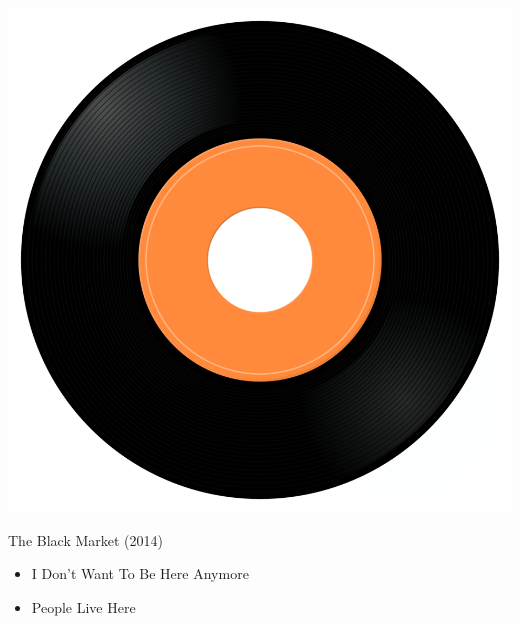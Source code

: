 \begin{minipage}[t]{0.25\textwidth}\vspace{0pt}
\captionsetup{type=figure}
\includegraphics[width=\textwidth]{Images/cover.png}
\caption*{The Black Market (2014)}
\end{minipage}
\begin{minipage}[t]{0.25\textwidth}\vspace{0pt}
\begin{itemize}[nosep,leftmargin=1em,labelwidth=*,align=left]
	\setlength{\itemsep}{0pt}
	\item I Don't Want To Be Here Anymore
	\item People Live Here
\end{itemize}
\end{minipage}
